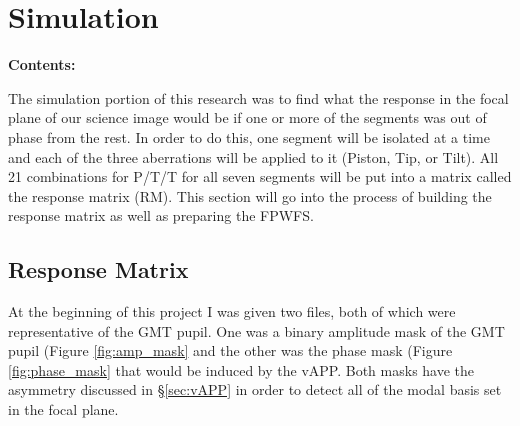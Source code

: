 
\chapter{Simulation} %

\noindent\textbf{\large Contents:}

\noindent\hrulefill
\noindent\startcontents[chapters]
\noindent{}
\noindent\hrulefill

\label{Chapter2}%

The simulation portion of this research was to find what the response in the focal plane of our science image would be if one or more of the segments was out of phase from the rest.  In order to do this, one segment will be isolated at a time and each of the three aberrations will be applied to it (Piston, Tip, or Tilt).  All 21 combinations for P/T/T for all seven segments will be put into a matrix called the response matrix (RM).  This section will go into the process of building the response matrix as well as preparing the FPWFS.


\section{Response Matrix}
\label{sec:RM}

At the beginning of this project I was given two files, both of which were representative of the GMT pupil.  One was a binary amplitude mask of the GMT pupil (Figure \ref{fig:amp_mask} and the other was the phase mask (Figure \ref{fig:phase_mask} that would be induced by the vAPP.  Both masks have the asymmetry discussed in \S \ref{sec:vAPP} in order to detect all of the modal basis set in the focal plane.

